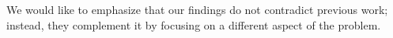 We would like to emphasize that our findings do not contradict previous work; instead, they complement it by focusing on a different aspect of the problem.
